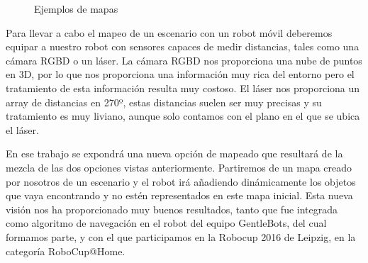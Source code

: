 \begin{figure}[hbtp]
  \begin{center}
  \end{center}
  \caption{Ejemplos de mapas}
  \label{fig:maps-ej}
\end{figure}
Para llevar a cabo el mapeo de un escenario con un robot móvil deberemos equipar a nuestro robot con sensores capaces de medir distancias, tales como una cámara RGBD o un láser. La cámara RGBD nos proporciona una nube de puntos en 3D, por lo que nos proporciona una información muy rica del entorno pero el tratamiento de esta información resulta muy costoso. El láser nos proporciona un array de distancias en 270º, estas distancias suelen ser muy precisas y su tratamiento es muy liviano, aunque solo contamos con el plano en el que se ubica el láser. 

En ese trabajo se expondrá una nueva opción de mapeado que resultará de la mezcla de las dos opciones vistas anteriormente. Partiremos de un mapa creado por nosotros de un escenario y el robot irá añadiendo dinámicamente los objetos que vaya encontrando y no estén representados en este mapa inicial. Esta nueva visión nos ha proporcionado muy buenos resultados, tanto que fue integrada como algoritmo de navegación en el robot del equipo GentleBots, del cual formamos parte, y con el que participamos en la Robocup 2016 de Leipzig, en la categoría RoboCup@Home.



